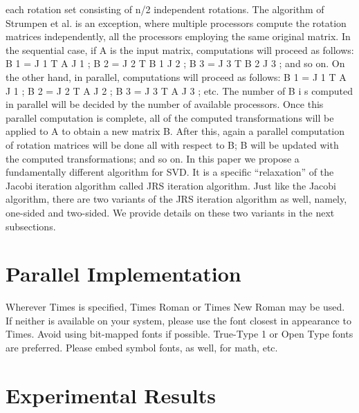 \documentclass[10pt, conference, compsocconf]{IEEEtran}
\begin{document}
each rotation set consisting of n/2 independent rotations. The
algorithm of Strumpen et al. is an exception, where multiple
processors compute the rotation matrices independently, all
the processors employing the same original matrix. In the
sequential case, if A is the input matrix, computations will
proceed as follows: B 1 = J 1 T A J 1 ; B 2 = J 2 T B 1 J 2 ; B 3 =
J 3 T B 2 J 3 ; and so on. On the other hand, in parallel, computations
will proceed as follows: B 1 = J 1 T A J 1 ; B 2 = J 2 T A J 2 ; B 3 =
J 3 T A J 3 ; etc. The number of B i s computed in parallel will
be decided by the number of available processors. Once
this parallel computation is complete, all of the computed
transformations will be applied to A to obtain a new matrix
B. After this, again a parallel computation of rotation matrices
will be done all with respect to B; B will be updated with the
computed transformations; and so on.
In this paper we propose a fundamentally different algorithm
for SVD. It is a specific “relaxation” of the Jacobi iteration
algorithm called JRS iteration algorithm. Just like the Jacobi
algorithm, there are two variants of the JRS iteration algorithm
as well, namely, one-sided and two-sided. We provide details
on these two variants in the next subsections.


\section{Parallel Implementation}
Wherever Times is specified, Times Roman or Times New Roman may be used. If neither is available on your system, please use the font closest in appearance to Times. Avoid using bit-mapped fonts if possible. True-Type 1 or Open Type fonts are preferred. Please embed symbol fonts, as well, for math, etc.



\section{Experimental Results}
\end{document}
